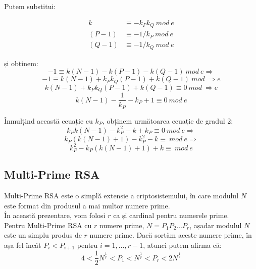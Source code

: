 \documentclass[12]{report}
\begin{document}
Putem substitui:

\begin{align*}
k &\equiv -k_P k_Q \ mod \ e \\
(P-1) &\equiv -1/k_P \ mod \ e \\
(Q-1) &\equiv -1/k_Q \ mod \ e
\end{align*}

și obținem:
$$ -1 \equiv k(N-1) - k(P-1) - k(Q-1) \ mod \ e \Rightarrow $$
$$ -1 \equiv k(N-1) + k_Pk_Q(P-1) + k(Q-1) \ mod \ \Rightarrow e$$
$$ k(N-1) + k_Pk_Q(P-1) + k(Q-1) \equiv 0 \ mod \ \Rightarrow e$$
$$ k(N-1) - \frac{1}{k_P} - k_P + 1 \equiv 0 \ mod \ e$$

Înmulțind această ecuație cu $k_P$, obținem următoarea ecuație de gradul 2:
$$ k_P k (N-1) - k_{P}^{2} - k + k_P \equiv 0 \ mod \ e \Rightarrow $$
$$ k_P(k(N-1)+1) - k_{P}^{2} - k \equiv \ mod \ e \Rightarrow $$
$$ k_{P}^{2} - k_P(k(N-1)+1) + k \equiv \ mod \ e $$

\subsection{Multi-Prime RSA}
Multi-Prime RSA este o simplă extensie a criptosistemului, în care modulul $N$ este format din produsul a mai multor numere prime. \\
În această prezentare, vom folosi $r$ ca și cardinal pentru numerele prime.\\
Pentru Multi-Prime RSA cu $r$ numere prime, $N=P_1 P_2 \dots P_r$, așadar modulul $N$ este un simplu produs de $r$ numere prime. Dacă sortăm aceste numere prime, în așa fel încât $P_i < P_{i+1}$ pentru $i=1, \dots, r-1$, atunci putem afirma că:
\begin{equation}
4<\frac{1}{2}N^{\frac{1}{r}}<P_1<N^{\frac{1}{r}}<P_r <2N^{\frac{1}{r}}
\end{equation}
\end{document}
